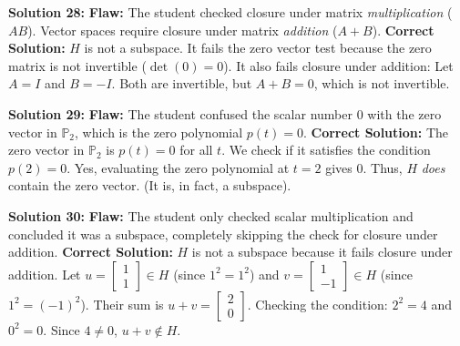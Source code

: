 \documentclass[11pt]{article}
\begin{document}
\vspace{0.3cm}
\textbf{Solution 28:}
\textbf{Flaw:} The student checked closure under matrix \textit{multiplication} ($AB$). Vector spaces require closure under matrix \textit{addition} ($A+B$).
\textbf{Correct Solution:} $H$ is not a subspace. It fails the zero vector test because the zero matrix is not invertible ($\det(0) = 0$). It also fails closure under addition: Let $A = I$ and $B = -I$. Both are invertible, but $A+B = 0$, which is not invertible.

\vspace{0.3cm}
\textbf{Solution 29:}
\textbf{Flaw:} The student confused the scalar number $0$ with the zero vector in $\mathbb{P}_2$, which is the zero polynomial $p(t) = 0$.
\textbf{Correct Solution:} The zero vector in $\mathbb{P}_2$ is $p(t) = 0$ for all $t$. We check if it satisfies the condition $p(2) = 0$. Yes, evaluating the zero polynomial at $t=2$ gives $0$. Thus, $H$ \textit{does} contain the zero vector. (It is, in fact, a subspace).

\vspace{0.3cm}
\textbf{Solution 30:}
\textbf{Flaw:} The student only checked scalar multiplication and concluded it was a subspace, completely skipping the check for closure under addition.
\textbf{Correct Solution:} $H$ is not a subspace because it fails closure under addition. Let $u = \begin{bmatrix} 1 \\ 1 \end{bmatrix} \in H$ (since $1^2=1^2$) and $v = \begin{bmatrix} 1 \\ -1 \end{bmatrix} \in H$ (since $1^2=(-1)^2$). Their sum is $u+v = \begin{bmatrix} 2 \\ 0 \end{bmatrix}$. Checking the condition: $2^2 = 4$ and $0^2 = 0$. Since $4 \neq 0$, $u+v \notin H$.

\newpage

\end{document}
